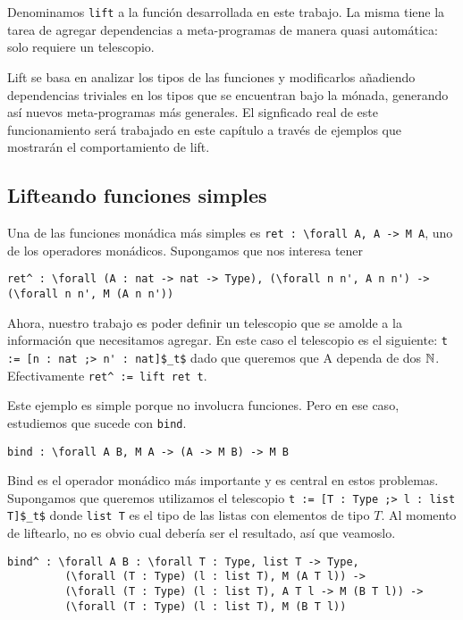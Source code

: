\section{\lift}

Denominamos \lstinline{lift} a la función desarrollada en este trabajo.
La misma tiene la tarea de agregar dependencias a meta-programas de manera quasi automática: solo requiere un telescopio.

Lift se basa en analizar los tipos de las funciones y modificarlos añadiendo dependencias triviales en los tipos que se encuentran bajo la mónada, generando así nuevos meta-programas más generales.
El signficado real de este funcionamiento será trabajado en este capítulo a través de ejemplos que mostrarán el comportamiento de lift.

\subsection{Lifteando funciones simples}

Una de las funciones monádica más simples es \lstinline{ret : \forall A, A -> M A}, uno de los operadores monádicos.
Supongamos que nos interesa tener
\begin{lstlisting}
ret^ : \forall (A : nat -> nat -> Type), (\forall n n', A n n') -> (\forall n n', M (A n n'))
\end{lstlisting}

Ahora, nuestro trabajo es poder definir un telescopio que se amolde a la información que necesitamos agregar.
En este caso el telescopio es el siguiente: \lstinline{t := [n : nat ;> n' : nat]$_t$} dado que queremos que \lstinline{}{A} dependa de dos $\mathbb{N}$. Efectivamente \lstinline{ret^ := lift ret t}.

Este ejemplo es simple porque no involucra funciones. Pero en ese caso, estudiemos que sucede con \lstinline{bind}.
\begin{lstlisting}
bind : \forall A B, M A -> (A -> M B) -> M B
\end{lstlisting}

Bind es el operador monádico más importante y es central en estos problemas.
Supongamos que queremos utilizamos el telescopio \lstinline{t := [T : Type ;> l : list T]$_t$} donde \lstinline{list T} es el tipo de las listas con elementos de tipo $T$.
Al momento de liftearlo, no es obvio cual debería ser el resultado, así que veamoslo.

\begin{lstlisting}
bind^ : \forall A B : \forall T : Type, list T -> Type,
         (\forall (T : Type) (l : list T), M (A T l)) ->
         (\forall (T : Type) (l : list T), A T l -> M (B T l)) ->
         (\forall (T : Type) (l : list T), M (B T l))
\end{lstlisting}

